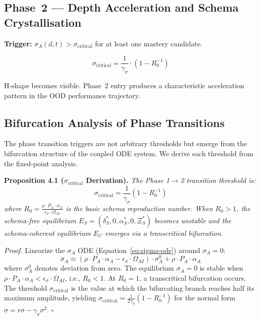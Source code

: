 \documentclass[11pt,a4paper]{article}
\begin{document}
\subsection*{Phase~2 --- Depth Acceleration and Schema Crystallisation}

\textbf{Trigger:} $\sigma_A(d,t) > \sigma_{\text{critical}}$ for at
least one mastery candidate.

\begin{equation}\label{eq:sigma-critical}
\sigma_{\text{critical}} = \frac{1}{\gamma_\sigma} \cdot (1 - R_0^{-1})
\end{equation}

H-shape becomes visible. Phase~2 entry produces a characteristic
acceleration pattern in the OOD performance trajectory.

\subsection{Bifurcation Analysis of Phase Transitions}\label{sec:bifurcation}

The phase transition triggers are not arbitrary thresholds but emerge from
the bifurcation structure of the coupled ODE system. We derive each
threshold from the fixed-point analysis.

\textbf{Proposition 4.1 ($\sigma_{\text{critical}}$ Derivation).}
\textit{The Phase 1$\to$2 transition threshold is:
\begin{equation}\label{eq:sigma-critical-derived}
\sigma_{\text{critical}} = \frac{1}{\gamma_\sigma}(1 - R_0^{-1})
\end{equation}
where $R_0 = \frac{\rho \cdot P_A \cdot \alpha_A}{\epsilon_\sigma \cdot \Omega_{AI}}$ is the
basic schema reproduction number. When $R_0 > 1$, the schema-free
equilibrium $E_S = (\delta_S^*, 0, \alpha_S^*, 0, \Xi_S^*)$ becomes unstable
and the schema-coherent equilibrium $E_C$ emerges via a transcritical
bifurcation.}

\textit{Proof.} Linearize the $\sigma_A$ ODE (Equation~\eqref{eq:sigma-ode})
around $\sigma_A = 0$:
\begin{equation}
\dot{\sigma}_A \approx (\rho \cdot P_A \cdot \alpha_A - \epsilon_\sigma \cdot \Omega_{AI}) \cdot \sigma_A^0 + \rho \cdot P_A \cdot \alpha_A
\end{equation}
where $\sigma_A^0$ denotes deviation from zero. The equilibrium $\sigma_A = 0$
is stable when $\rho \cdot P_A \cdot \alpha_A < \epsilon_\sigma \cdot \Omega_{AI}$,
i.e., $R_0 < 1$. At $R_0 = 1$, a transcritical bifurcation occurs. The
threshold $\sigma_{\text{critical}}$ is the value at which the bifurcating
branch reaches half its maximum amplitude, yielding
$\sigma_{\text{critical}} = \frac{1}{2\gamma_\sigma}(1 - R_0^{-1})$ for the
normal form $\dot{\sigma} = r\sigma - \gamma_\sigma \sigma^2$. $\square$
\end{document}

